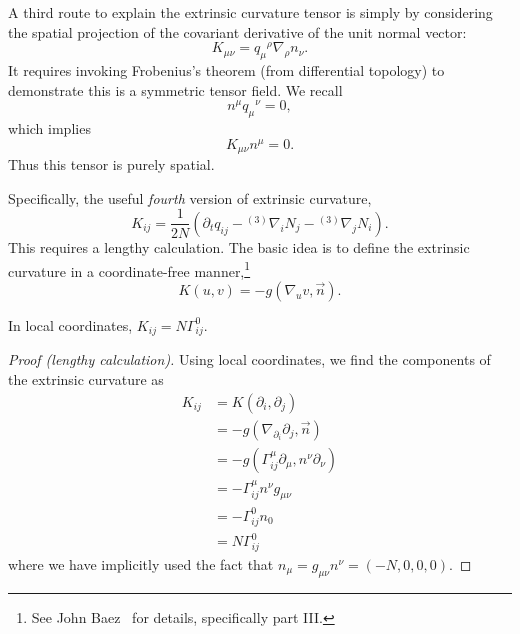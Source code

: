 A third route to explain the extrinsic curvature tensor is simply by
considering the spatial projection of the covariant derivative of the unit
normal vector:
\begin{equation}
K_{\mu\nu} = {q_{\mu}}^{\rho}\nabla_{\rho}n_{\nu}.
\end{equation}
It requires invoking Frobenius's theorem (from differential topology) to
demonstrate this is a symmetric tensor field. We recall
\begin{equation}
n^{\mu}{q_{\mu}}^{\nu} = 0,
\end{equation}
which implies
\begin{equation}
K_{\mu\nu}n^{\mu} = 0.
\end{equation}
Thus this tensor is purely spatial.

Specifically, the useful \emph{fourth} version of extrinsic curvature,
\begin{equation}\label{eq:extrinsic-curvature:as-time-derivative-of-three-metric}
K_{ij} = \frac{1}{2N}(\partial_{t}q_{ij} - {{}^{(3)}}\nabla_{i}N_{j} - {{}^{(3)}}\nabla_{j}N_{i}).
\end{equation}
This requires a lengthy calculation. The basic idea is to define the
extrinsic curvature in a coordinate-free manner,\footnote{See John
Baez~\cite{baez} for details, specifically part III.}
\begin{equation}
K(u,v) = -g(\nabla_{u}v,\vec{n}).
\end{equation}

\begin{lemma}
In local coordinates, $K_{ij} = N\Gamma^{0}_{ij}$.
\end{lemma}
\begin{proof}[Proof (lengthy calculation)]
Using local coordinates, we find the components of the extrinsic curvature as
\begin{subequations}
  \begin{align}
    K_{ij} &= K(\partial_{i}, \partial_{j})\\
    &= -g(\nabla_{\partial_{i}}\partial_{j}, \vec{n})\\
    &= -g(\Gamma^{\mu}_{ij}\partial_{\mu}, n^{\nu}\partial_{\nu})\\
    &= -\Gamma^{\mu}_{ij}n^{\nu}g_{\mu\nu}\\
    &= -\Gamma^{0}_{ij}n_{0}\\
    &= N\Gamma^{0}_{ij}
  \end{align}
\end{subequations}
where we have implicitly used the fact that
$n_{\mu}=g_{\mu\nu}n^{\nu}=(-N,0,0,0)$.
\end{proof}

